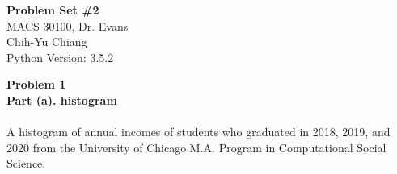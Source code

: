 \documentclass[letterpaper,12pt]{article}
\theoremstyle{definition}
\begin{document}
\begin{flushleft}
  \textbf{\large{Problem Set \#2}} \\
  MACS 30100, Dr. Evans \\
  Chih-Yu Chiang \\
  Python Version: 3.5.2
\end{flushleft}
\vspace{5mm}
\noindent\textbf{Problem 1} \\
\noindent\textbf{Part (a). histogram} \\
\\
A histogram of annual incomes of students who graduated in 2018, 2019, and 2020 from the University of Chicago M.A. Program in Computational Social Science. \\
\\
\begin{figure}[htb]\centering\captionsetup{width=6.0in}
  \caption{\textbf{}}
\end{figure} \\

\clearpage
\end{document}
